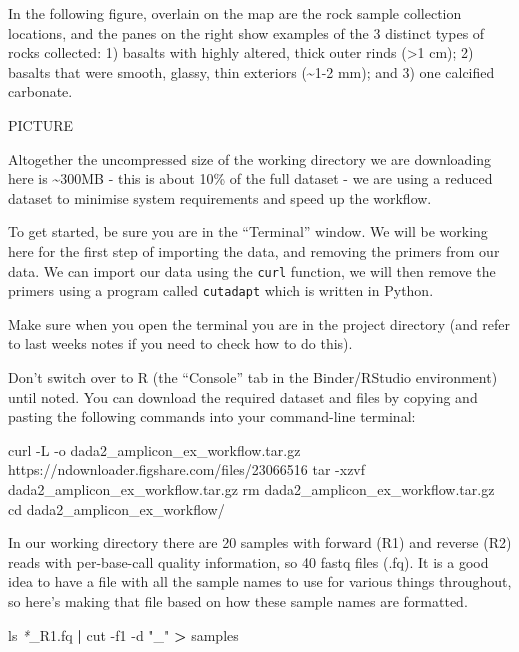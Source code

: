 \documentclass[
]{book}
\newenvironment{Shaded}{\begin{snugshade}}{\end{snugshade}}
\newcommand{\AttributeTok}[1]{\textcolor[rgb]{0.77,0.63,0.00}{#1}}
\newcommand{\BuiltInTok}[1]{#1}
\newcommand{\ExtensionTok}[1]{#1}
\newcommand{\FunctionTok}[1]{\textcolor[rgb]{0.00,0.00,0.00}{#1}}
\newcommand{\KeywordTok}[1]{\textcolor[rgb]{0.13,0.29,0.53}{\textbf{#1}}}
\newcommand{\NormalTok}[1]{#1}
\newcommand{\OperatorTok}[1]{\textcolor[rgb]{0.81,0.36,0.00}{\textbf{#1}}}
\newcommand{\PreprocessorTok}[1]{\textcolor[rgb]{0.56,0.35,0.01}{\textit{#1}}}
\newcommand{\StringTok}[1]{\textcolor[rgb]{0.31,0.60,0.02}{#1}}
\begin{document}
In the following figure, overlain on the map are the rock sample collection locations, and the panes on the right show examples of the 3 distinct types of rocks collected: 1) basalts with highly altered, thick outer rinds (\textgreater1 cm); 2) basalts that were smooth, glassy, thin exteriors (\textasciitilde1-2 mm); and 3) one calcified carbonate.

PICTURE

Altogether the uncompressed size of the working directory we are downloading here is \textasciitilde300MB - this is about 10\% of the full dataset - we are using a reduced dataset to minimise system requirements and speed up the workflow.

To get started, be sure you are in the ``Terminal'' window. We will be working here for the first step of importing the data, and removing the primers from our data. We can import our data using the \texttt{curl} function, we will then remove the primers using a program called \texttt{cutadapt} which is written in Python.

Make sure when you open the terminal you are in the project directory (and refer to last weeks notes if you need to check how to do this).

Don't switch over to R (the ``Console'' tab in the Binder/RStudio environment) until noted. You can download the required dataset and files by copying and pasting the following commands into your command-line terminal:

\begin{Shaded}
\begin{Highlighting}[]
    \ExtensionTok{curl} \AttributeTok{{-}L} \AttributeTok{{-}o}\NormalTok{ dada2\_amplicon\_ex\_workflow.tar.gz https://ndownloader.figshare.com/files/23066516}
    \FunctionTok{tar} \AttributeTok{{-}xzvf}\NormalTok{ dada2\_amplicon\_ex\_workflow.tar.gz}
    \FunctionTok{rm}\NormalTok{ dada2\_amplicon\_ex\_workflow.tar.gz}
    \BuiltInTok{cd}\NormalTok{ dada2\_amplicon\_ex\_workflow/}
\end{Highlighting}
\end{Shaded}

In our working directory there are 20 samples with forward (R1) and reverse (R2) reads with per-base-call quality information, so 40 fastq files (.fq). It is a good idea to have a file with all the sample names to use for various things throughout, so here's making that file based on how these sample names are formatted.

\begin{Shaded}
\begin{Highlighting}[]
    \FunctionTok{ls} \PreprocessorTok{*}\NormalTok{\_R1.fq }\KeywordTok{|} \FunctionTok{cut} \AttributeTok{{-}f1} \AttributeTok{{-}d} \StringTok{"\_"} \OperatorTok{\textgreater{}}\NormalTok{ samples}
\end{Highlighting}
\end{Shaded}
\end{document}
